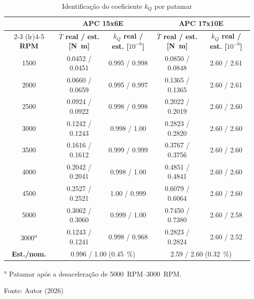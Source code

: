 \begin{table}[H]
    \centering
    \caption{Identificação do coeficiente $k_Q$ por patamar}
    \label{tab:resultado_identificacao_cq}
    \small
    \setlength{\tabcolsep}{3pt}
    \begin{tabular}{ccccc}
        \toprule
        & \multicolumn{2}{c}{\textbf{APC 15x6E}} & \multicolumn{2}{c}{\textbf{APC 17x10E}} \\
        \cmidrule(lr){2-3} \cmidrule(lr){4-5}
        \textbf{RPM} &
        \textbf{$\bar{T}$ real / est. [\si{\newton\meter}]} &
        \textbf{$k_{Q}$ real / est. [$10^{-6}$]} &
        \textbf{$\bar{T}$ real / est. [\si{\newton\meter}]} &
        \textbf{$k_{Q}$ real / est. [$10^{-6}$]} \\
        \midrule
        1500 & \num{0,0452} / \num{0,0451} & \num{0,995} / \num{0,998} & \num{0,0850} / \num{0,0848} & \num{2,60} / \num{2,61} \\
        2000 & \num{0,0660} / \num{0,0659} & \num{0,995} / \num{0,997} & \num{0,1365} / \num{0,1365} & \num{2,60} / \num{2,61} \\
        2500 & \num{0,0924} / \num{0,0922} & \num{0,998} / \num{0,998} & \num{0,2022} / \num{0,2019} & \num{2,60} / \num{2,60} \\
        3000 & \num{0,1242} / \num{0,1243} & \num{0,998} / \num{1,00}  & \num{0,2823} / \num{0,2820} & \num{2,60} / \num{2,60} \\
        3500 & \num{0,1616} / \num{0,1612} & \num{0,999} / \num{0,999} & \num{0,3767} / \num{0,3756} & \num{2,60} / \num{2,60} \\
        4000 & \num{0,2042} / \num{0,2041} & \num{0,998} / \num{1,00}  & \num{0,4851} / \num{0,4841} & \num{2,60} / \num{2,60} \\
        4500 & \num{0,2527} / \num{0,2521} & \num{1,00} / \num{0,999}  & \num{0,6079} / \num{0,6064} & \num{2,60} / \num{2,60} \\
        5000 & \num{0,3062} / \num{0,3060} & \num{0,999} / \num{1,00}  & \num{0,7450} / \num{0,7380} & \num{2,60} / \num{2,58} \\
        3000\textsuperscript{a} & \num{0,1243} / \num{0,1241} & \num{0,998} / \num{0,968} & \num{0,2823} / \num{0,2824} & \num{2,60} / \num{2,52} \\
        \midrule
        \textbf{Est./nom.} & \multicolumn{2}{c}{\num{0,996} / \num{1,00} (\SI{0,45}{\percent})} &
            \multicolumn{2}{c}{\num{2,59} / \num{2,60} (\SI{0,32}{\percent})} \\
        \bottomrule
    \end{tabular}

    \vspace{2pt}
    {\footnotesize \textsuperscript{a} Patamar após a desaceleração de \SIrange{5000}{3000}{RPM}.}

    \vspace{0.2cm}
    {\small Fonte: Autor (2026)}
\end{table}

